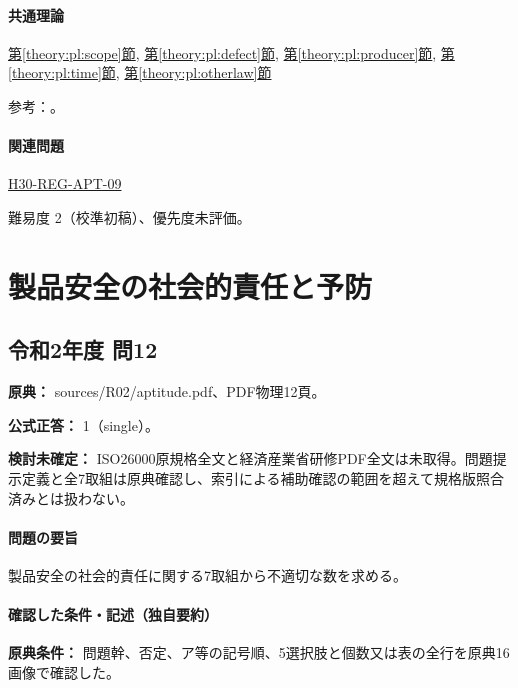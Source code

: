 \paragraph{共通理論} \hyperref[theory:pl:scope]{第\ref*{theory:pl:scope}節}, \hyperref[theory:pl:defect]{第\ref*{theory:pl:defect}節}, \hyperref[theory:pl:producer]{第\ref*{theory:pl:producer}節}, \hyperref[theory:pl:time]{第\ref*{theory:pl:time}節}, \hyperref[theory:pl:otherlaw]{第\ref*{theory:pl:otherlaw}節}

\par 参考：\cite{pl_statute,pl_qa,pl_transition2020}。

\paragraph{関連問題} \hyperref[q:h30-reg-apt-09]{H30-REG-APT-09}

\par 難易度 2（校準初稿）、優先度未評価。

\section{製品安全の社会的責任と予防}

\subsection{令和2年度 問12}
\label{q:r02-reg-apt-12}

\noindent\textbf{原典：} sources/R02/aptitude.pdf、PDF物理12頁。

\textbf{公式正答：} 1（single）。

\par\textbf{検討未確定：} ISO26000原規格全文と経済産業省研修PDF全文は未取得。問題提示定義と全7取組は原典確認し、索引による補助確認の範囲を超えて規格版照合済みとは扱わない。

\paragraph{問題の要旨} 製品安全の社会的責任に関する7取組から不適切な数を求める。

\paragraph{確認した条件・記述（独自要約）}\mbox{}\par

\noindent\textbf{原典条件：} 問題幹、否定、ア等の記号順、5選択肢と個数又は表の全行を原典16画像で確認した。\par

